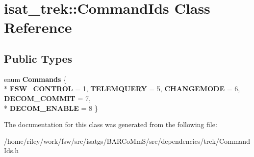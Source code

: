 \hypertarget{classisat__trek_1_1_command_ids}{}\section{isat\+\_\+trek\+:\+:Command\+Ids Class Reference}
\label{classisat__trek_1_1_command_ids}
\subsection*{Public Types}
\begin{DoxyCompactItemize}
\item 
enum {\bfseries Commands} \{ \\*
{\bfseries F\+S\+W\+\_\+\+C\+O\+N\+T\+R\+OL} = 1, 
{\bfseries T\+E\+L\+E\+M\+Q\+U\+E\+RY} = 5, 
{\bfseries C\+H\+A\+N\+G\+E\+M\+O\+DE} = 6, 
{\bfseries D\+E\+C\+O\+M\+\_\+\+C\+O\+M\+M\+IT} = 7, 
\\*
{\bfseries D\+E\+C\+O\+M\+\_\+\+E\+N\+A\+B\+LE} = 8
 \}\hypertarget{classisat__trek_1_1_command_ids_a8ddb80ea111233b76913d8125268c14a}{}\label{classisat__trek_1_1_command_ids_a8ddb80ea111233b76913d8125268c14a}

\end{DoxyCompactItemize}


The documentation for this class was generated from the following file\+:\begin{DoxyCompactItemize}
\item 
/home/riley/work/fsw/src/isatgs/\+B\+A\+R\+Co\+Mm\+S/src/dependencies/trek/Command\+Ids.\+h\end{DoxyCompactItemize}
